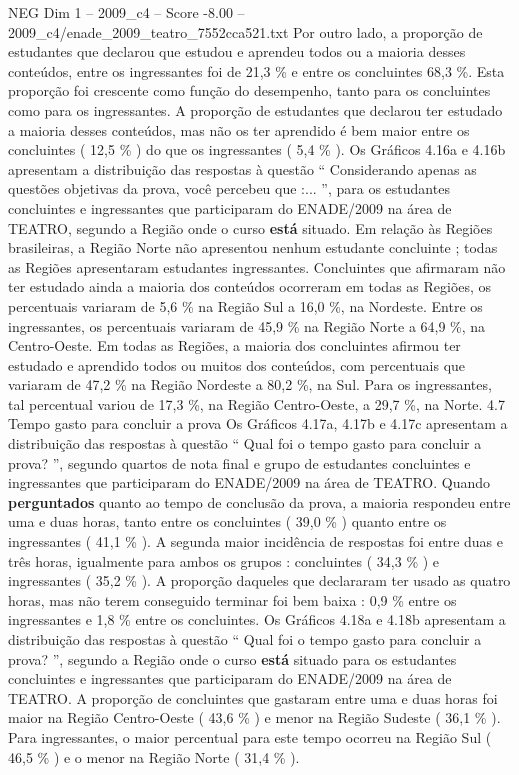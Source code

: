 \begin{textsample}{NEG Dim 1 – 2009\_c4 – Score -8.00 – 2009\_c4/enade\_2009\_teatro\_7552cca521.txt}
Por outro lado, a proporção de estudantes que declarou que estudou e aprendeu todos ou a maioria desses conteúdos, entre os ingressantes foi de 21,3 \% e entre os concluintes 68,3 \%.
Esta proporção foi crescente como função do desempenho, tanto para os concluintes como para os ingressantes.
A proporção de estudantes que declarou ter estudado a maioria desses conteúdos, mas não os ter aprendido é bem maior entre os concluintes ( 12,5 \% ) do que os ingressantes ( 5,4 \% ).
Os Gráficos 4.16a e 4.16b apresentam a distribuição das respostas à questão “ Considerando apenas as questões objetivas da prova, você percebeu que :... ”, para os estudantes concluintes e ingressantes que participaram do ENADE/2009 na área de TEATRO, segundo a Região onde o curso \textbf{está} situado.
Em relação às Regiões brasileiras, a Região Norte não apresentou nenhum estudante concluinte ; todas as Regiões apresentaram estudantes ingressantes.
Concluintes que afirmaram não ter estudado ainda a maioria dos conteúdos ocorreram em todas as Regiões, os percentuais variaram de 5,6 \% na Região Sul a 16,0 \%, na Nordeste.
Entre os ingressantes, os percentuais variaram de 45,9 \% na Região Norte a 64,9 \%, na Centro-Oeste.
Em todas as Regiões, a maioria dos concluintes afirmou ter estudado e aprendido todos ou muitos dos conteúdos, com percentuais que variaram de 47,2 \% na Região Nordeste a 80,2 \%, na Sul.
Para os ingressantes, tal percentual variou de 17,3 \%, na Região Centro-Oeste, a 29,7 \%, na Norte. 4.7 Tempo gasto para concluir a prova Os Gráficos 4.17a, 4.17b e 4.17c apresentam a distribuição das respostas à questão “ Qual foi o tempo gasto para concluir a prova? ”, segundo quartos de nota final e grupo de estudantes concluintes e ingressantes que participaram do ENADE/2009 na área de TEATRO.
Quando \textbf{perguntados} quanto ao tempo de conclusão da prova, a maioria respondeu entre uma e duas horas, tanto entre os concluintes ( 39,0 \% ) quanto entre os ingressantes ( 41,1 \% ).
A segunda maior incidência de respostas foi entre duas e três horas, igualmente para ambos os grupos : concluintes ( 34,3 \% ) e ingressantes ( 35,2 \% ).
A proporção daqueles que declararam ter usado as quatro horas, mas não terem conseguido terminar foi bem baixa : 0,9 \% entre os ingressantes e 1,8 \% entre os concluintes.
Os Gráficos 4.18a e 4.18b apresentam a distribuição das respostas à questão “ Qual foi o tempo gasto para concluir a prova? ”, segundo a Região onde o curso \textbf{está} situado para os estudantes concluintes e ingressantes que participaram do ENADE/2009 na área de TEATRO.
A proporção de concluintes que gastaram entre uma e duas horas foi maior na Região Centro-Oeste ( 43,6 \% ) e menor na Região Sudeste ( 36,1 \% ).
Para ingressantes, o maior percentual para este tempo ocorreu na Região Sul ( 46,5 \% ) e o menor na Região Norte ( 31,4 \% ).

\end{textsample}

